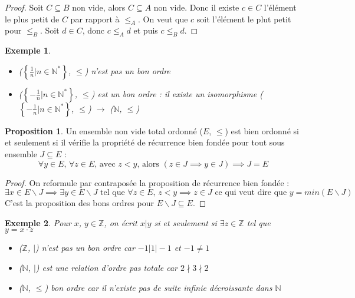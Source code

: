 \documentclass{article}
\theoremstyle{definition}
\theoremstyle{definition}
\newtheorem{prop}{Proposition}
\theoremstyle{definition}
\theoremstyle{plain}
\newtheorem{example}{Exemple}
\theoremstyle{theorem}
\theoremstyle{theorem}
\begin{document}
\begin{proof}

    Soit $C \subseteq B$ non vide, alors $C \subseteq A$ non vide. Donc il existe $c \in C$ l'élément le plus petit de $C$ par rapport à $\leqslant_A$. On
    veut que $c$ soit l'élément le plut petit pour $\leqslant_B$. Soit $d \in C$, donc $c \leqslant_A d$ et puis $c \leqslant_B d$.

\end{proof}

\begin{example}
    \begin{itemize}
        \item ($\left\{\frac{1}{n} | n \in \mathbb{N}^*\right\}$, $\leqslant$) n'est pas un bon ordre
        \item ($\left\{-\frac{1}{n} | n \in \mathbb{N}^*\right\}$, $\leqslant$) est un bon ordre : il existe un isomorphisme ($\left\{-\frac{1}{n} | n \in \mathbb{N}^*\right\}$, $\leqslant$) $\to$ ($\mathbb{N}$, $\leqslant$)
    \end{itemize}
\end{example}

\begin{prop}

    Un ensemble non vide total ordonné ($E$, $\leqslant$) est bien ordonné si et seulement si il vérifie la propriété de récurrence bien fondée pour tout sous ensemble $J \subseteq E$ :
    \begin{equation*}
        \forall y \in E \text{, } \forall z \in E \text{, avec } z < y \text{, alors } (z \in J \implies y \in J) \implies J = E
    \end{equation*}
	\noindent

\end{prop}

\begin{proof}

    On reformule par contraposée la proposition de récurrence bien fondée :
    \begin{equation*}
        \exists x \in E\backslash J \implies \exists y \in E\backslash J \text{ tel que } \forall z \in E \text{, } z < y \implies z \in J \text{ ce qui veut dire que } y = min(E\backslash J)
    \end{equation*}
	\noindent
    C'est la proposition des bons ordres pour $E\backslash J \subseteq E$.

\end{proof}

\begin{example}
    Pour $x$, $y \in \mathbb{Z}$, on écrit $x | y$ si et seulement si $\exists z \in \mathbb{Z}$ tel que $y = x\cdot z$
    \begin{itemize}
        \item ($\mathbb{Z}$, $|$) n'est pas un bon ordre car $-1 | 1 | -1$ et $-1 \neq 1$
        \item ($\mathbb{N}$, $|$) est une relation d'ordre pas totale car $2 \nmid 3 \nmid 2$
        \item ($\mathbb{N}$, $\leqslant$) bon ordre car il n'existe pas de suite infinie décroissante dans $\mathbb{N}$
    \end{itemize}
\end{example}
\end{document}
